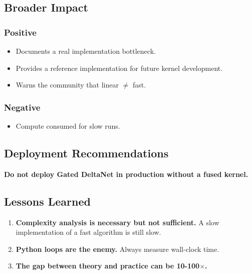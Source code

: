 \subsection{Broader Impact}

\subsubsection{Positive}

\begin{itemize}
\item Documents a real implementation bottleneck.
\item Provides a reference implementation for future kernel development.
\item Warns the community that linear $\ne$ fast.

\end{itemize}
\subsubsection{Negative}

\begin{itemize}
\item Compute consumed for slow runs.

\end{itemize}
\subsection{Deployment Recommendations}

\textbf{Do not deploy Gated DeltaNet in production without a fused kernel.}

\subsection{Lessons Learned}

\begin{enumerate}
\item \textbf{Complexity analysis is necessary but not sufficient.} A slow
  implementation of a fast algorithm is still slow.
\item \textbf{Python loops are the enemy.} Always measure wall-clock time.
\item \textbf{The gap between theory and practice can be 10-100$\times$.}

\end{enumerate}



